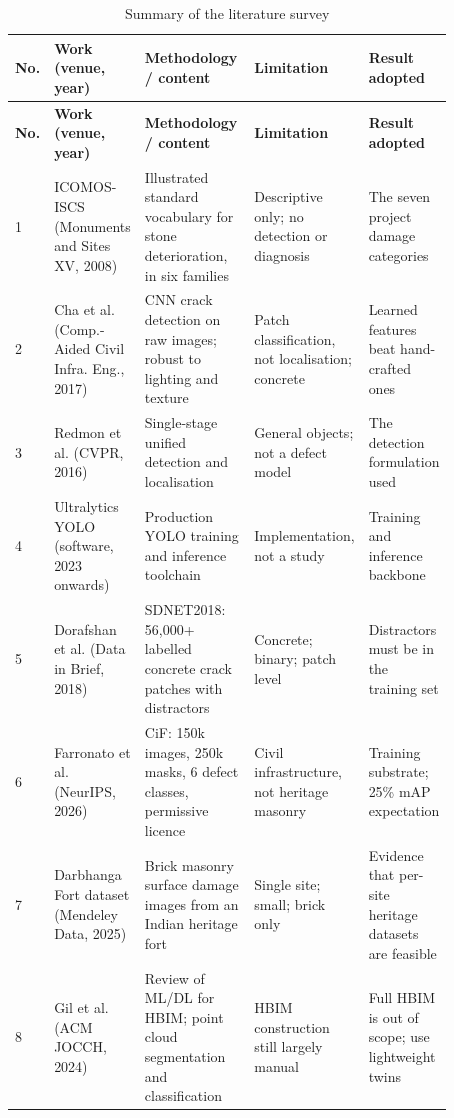\documentclass[a4paper,12pt,oneside]{book}
\begin{document}
{\small
\renewcommand{\arraystretch}{1.25}
\begin{longtable}{|p{0.04\linewidth}|p{0.19\linewidth}|p{0.26\linewidth}|p{0.21\linewidth}|p{0.17\linewidth}|}
\caption{Summary of the literature survey}\label{tab:survey}\\
\hline
\textbf{No.} & \textbf{Work (venue, year)} & \textbf{Methodology / content} & \textbf{Limitation} & \textbf{Result adopted} \\ \hline
\endfirsthead
\hline
\textbf{No.} & \textbf{Work (venue, year)} & \textbf{Methodology / content} & \textbf{Limitation} & \textbf{Result adopted} \\ \hline
\endhead
1 & ICOMOS-ISCS \cite{icomos2008glossary} (Monuments and Sites XV, 2008) & Illustrated standard vocabulary for stone deterioration, in six families & Descriptive only; no detection or diagnosis & The seven project damage categories \\ \hline
2 & Cha et al. \cite{cha2017deep} (Comp.-Aided Civil Infra. Eng., 2017) & CNN crack detection on raw images; robust to lighting and texture & Patch classification, not localisation; concrete & Learned features beat hand-crafted ones \\ \hline
3 & Redmon et al. \cite{redmon2016yolo} (CVPR, 2016) & Single-stage unified detection and localisation & General objects; not a defect model & The detection formulation used \\ \hline
4 & Ultralytics YOLO \cite{ultralytics2023yolo} (software, 2023 onwards) & Production YOLO training and inference toolchain & Implementation, not a study & Training and inference backbone \\ \hline
5 & Dorafshan et al. \cite{dorafshan2018sdnet} (Data in Brief, 2018) & SDNET2018: 56{,}000+ labelled concrete crack patches with distractors & Concrete; binary; patch level & Distractors must be in the training set \\ \hline
6 & Farronato et al. \cite{farronato2026cif} (NeurIPS, 2026) & CiF: 150k images, 250k masks, 6 defect classes, permissive licence & Civil infrastructure, not heritage masonry & Training substrate; 25\% mAP expectation \\ \hline
7 & Darbhanga Fort dataset \cite{darbhanga2025dataset} (Mendeley Data, 2025) & Brick masonry surface damage images from an Indian heritage fort & Single site; small; brick only & Evidence that per-site heritage datasets are feasible \\ \hline
8 & Gil et al. \cite{gil2024hbim} (ACM JOCCH, 2024) & Review of ML/DL for HBIM; point cloud segmentation and classification & HBIM construction still largely manual & Full HBIM is out of scope; use lightweight twins \\ \hline

\end{longtable}}
\end{document}
